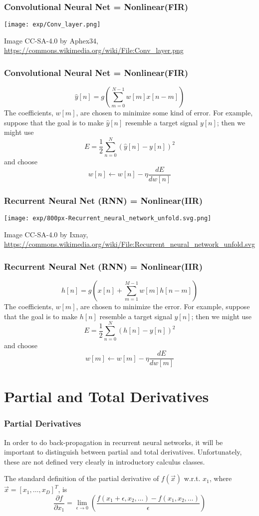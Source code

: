 \documentclass{beamer}
\begin{document}
\begin{frame}
  \frametitle{Convolutional Neural Net = Nonlinear(FIR)}
  \centerline{\texttt{[image: exp/Conv\_layer.png]}}
  \begin{tiny}Image CC-SA-4.0  by Aphex34, \url{https://commons.wikimedia.org/wiki/File:Conv_layer.png}\end{tiny}
\end{frame}

\begin{frame}
  \frametitle{Convolutional Neural Net = Nonlinear(FIR)}
  \[
  \hat{y}[n] = g\left(\sum_{m=0}^{N-1}w[m]x[n-m]\right)
  \]
  The coefficients, $w[m]$, are chosen to minimize some kind of error.
  For example, suppose that the goal is to make $\hat{y}[n]$ resemble a
  target signal $y[n]$; then we might use 
  \[
  E = \frac{1}{2}\sum_{n=0}^N\left(\hat{y}[n]-y[n]\right)^2
  \]
  and choose
  \[
  w[n] \leftarrow w[n]-\eta\frac{dE}{dw[n]}
  \]
\end{frame}

\begin{frame}
  \frametitle{Recurrent Neural Net (RNN) = Nonlinear(IIR)}
  \centerline{\texttt{[image: exp/800px-Recurrent\_neural\_network\_unfold.svg.png]}}
  \begin{tiny}Image CC-SA-4.0  by Ixnay, \url{https://commons.wikimedia.org/wiki/File:Recurrent_neural_network_unfold.svg}\end{tiny}
\end{frame}

\begin{frame}
  \frametitle{Recurrent Neural Net (RNN) = Nonlinear(IIR)}
  \[
  h[n] = g\left(x[n] + \sum_{m=1}^{M-1}w[m] h[n-m]\right)
  \]
  The coefficients, $w[m]$, are chosen to minimize the error.
  For example, suppose that the goal is to make $h[n]$ resemble a
  target signal $y[n]$; then we might use 
  \[
  E = \frac{1}{2}\sum_{n=0}^N\left(h[n]-y[n]\right)^2
  \]
  and choose
  \[
  w[m] \leftarrow w[m]-\eta\frac{dE}{dw[m]}
  \]
\end{frame}

\section[Partial Derivatives]{Partial and Total Derivatives}
\setcounter{subsection}{1}

\begin{frame}
  \frametitle{Partial Derivatives}

  In order to do back-propagation in recurrent neural networks, it
  will be important to distinguish between partial and total
  derivatives.  Unfortunately, these are not defined very clearly in
  introductory calculus classes.

  The standard definition of the partial derivative of $f(\vec{x})$
  w.r.t. $x_1$, where $\vec{x}=[x_1,\ldots,x_D]^T$, is
  \begin{displaymath}
    \frac{\partial f}{\partial x_1} = \lim_{\epsilon\rightarrow 0}\left(
    \frac{f(x_1+\epsilon,x_{2},\ldots)-f(x_1,x_{2},\ldots)}
         {\epsilon}\right)
  \end{displaymath}
\end{frame}
  
\end{document}
